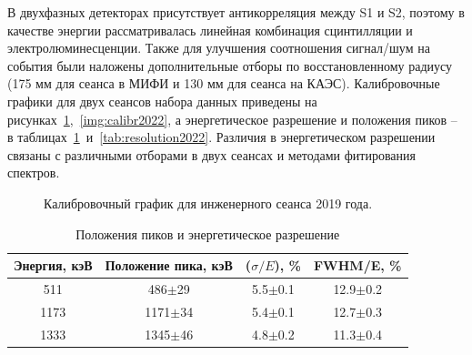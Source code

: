 В двухфазных детекторах присутствует антикорреляция между S1 и S2, поэтому в качестве энергии рассматривалась линейная комбинация сцинтилляции и электролюминесценции. Также для улучшения соотношения сигнал/шум на события были наложены дополнительные отборы по восстановленному радиусу (175 мм для сеанса в МИФИ и 130 мм для сеанса на КАЭС). Калибровочные графики для двух сеансов набора данных приведены на рисунках~\ref{img:calibplot2019},~\ref{img:calibr2022}, а энергетическое разрешение и положения пиков -- в таблицах~\ref{tab:resolution2019}~и~\ref{tab:resolution2022}. Различия в энергетическом разрешении связаны с различными отборами в двух сеансах и методами фитирования спектров.

\begin{figure}[ht]
  \caption{Калибровочный график для инженерного сеанса 2019 года.}
  \label{img:calibplot2019}  
\end{figure}

\begin{table}[ht]
    \centering
        \caption{Положения пиков и энергетическое разрешение}
\begin{tabular}{|c|c|c|c|}
\hline
    Энергия, кэВ & Положение пика, кэВ & ($\sigma/E$), \% & FWHM/E,  \%\\
    \hline
    511 & 486$\pm$29 & 5.5$\pm$0.1 & 12.9$\pm$0.2\\
    \hline
    1173 & 1171$\pm$34 & 5.4$\pm$0.1 & 12.7$\pm$0.3\\
    \hline
    1333 & 1345$\pm$46 & 4.8$\pm$0.2 & 11.3$\pm$0.4\\
    \hline
\end{tabular}
    \label{tab:resolution2019}
\end{table}

